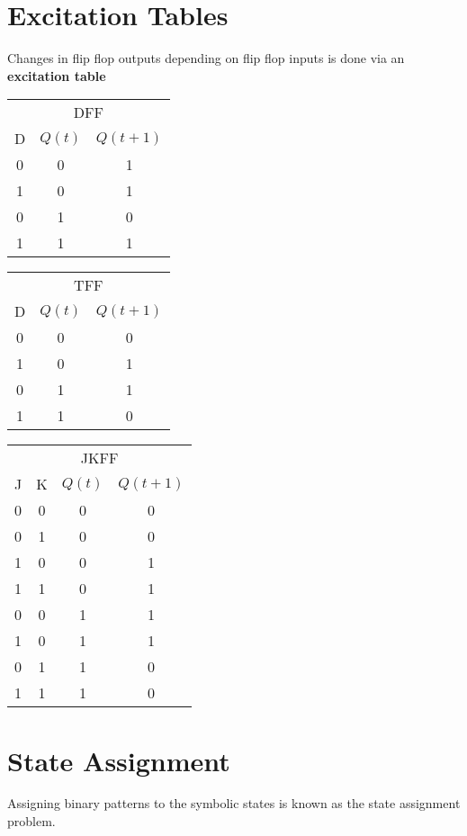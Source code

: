 \documentclass[12pt]{report}
\begin{document}
	\section{Excitation Tables}
		Changes in flip flop outputs depending on flip flop inputs is done via an \textbf{excitation table}\\
		\begin{tabular}{ c | c c}
			\multicolumn{3}{c}{DFF}\\
			D & $Q(t)$ & $Q(t+1)$\\
			\hline
			0 & 0 & 1 \\
			1 & 0 & 1 \\
			0 & 1 & 0 \\
			1 & 1 & 1 \\
		\end{tabular}
		 \hfill
		\begin{tabular}{ c | c c}
			\multicolumn{3}{c}{TFF}\\
			D & $Q(t)$ & $Q(t+1)$\\
			\hline
			0 & 0 & 0 \\
			1 & 0 & 1 \\
			0 & 1 & 1 \\
			1 & 1 & 0 \\
		\end{tabular} 
		\hfill
		\begin{tabular}{ c  c | c c}
			\multicolumn{4}{c}{JKFF}\\
			J & K & $Q(t)$ & $Q(t+1)$\\
			\hline
			0 & 0 & 0 & 0 \\
			0 & 1 & 0 & 0 \\
			1 & 0 & 0 & 1 \\
			1 & 1 & 0 & 1 \\
			0 & 0 & 1 & 1 \\
			1 & 0 & 1 & 1 \\
			0 & 1 & 1 & 0 \\
			1 & 1 & 1 & 0 \\
		\end{tabular}
	\section{State Assignment}
		Assigning binary patterns to the symbolic states is known as the state assignment problem.
\end{document}
